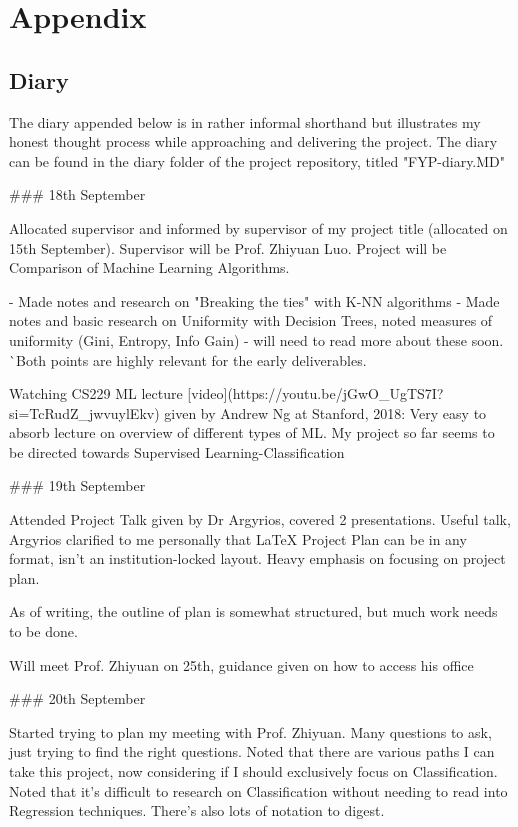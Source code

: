 \documentclass[letterpaper,10pt]{article}
\begin{document}
\appendix
\newpage
\section{Appendix}
\subsection{Diary}
The diary appended below is in rather informal shorthand but illustrates my honest thought process while approaching and delivering the project. The diary can be found in the diary folder of the project repository, titled "FYP-diary.MD"
\begin{markdown}

### 18th September 

Allocated supervisor and informed by supervisor of my project title (allocated on 15th September). Supervisor will be Prof. Zhiyuan Luo.
Project will be Comparison of Machine Learning Algorithms.

- Made notes and research on "Breaking the ties" with K-NN algorithms
- Made notes and basic research on Uniformity with Decision Trees, noted measures of uniformity (Gini, Entropy, Info Gain) - will need to read more about these soon.
^^ Both points are highly relevant for the early deliverables.

Watching CS229 ML lecture [video](https://youtu.be/jGwO_UgTS7I?si=TcRudZ_jwvuylEkv) given by Andrew Ng at Stanford, 2018: 
Very easy to absorb lecture on overview of different types of ML. My project so far seems to be directed towards Supervised Learning-Classification



### 19th September

Attended Project Talk given by Dr Argyrios, covered 2 presentations. Useful talk, Argyrios clarified to me personally that LaTeX Project Plan can be in any format, isn't an institution-locked layout.
Heavy emphasis on focusing on project plan.

As of writing, the outline of plan is somewhat structured, but much work needs to be done.

Will meet Prof. Zhiyuan on 25th, guidance given on how to access his office

### 20th September

Started trying to plan my meeting with Prof. Zhiyuan. Many questions to ask, just trying to find the right questions. Noted that there are various paths I can take this project, now considering if I should exclusively focus on Classification.
Noted that it's difficult to research on Classification without needing to read into Regression techniques. There's also lots of notation to digest.


\end{markdown}
\end{document}
